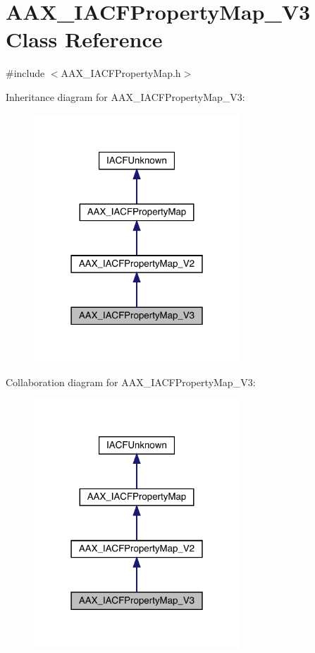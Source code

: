 \hypertarget{a01753}{}\section{A\+A\+X\+\_\+\+I\+A\+C\+F\+Property\+Map\+\_\+\+V3 Class Reference}
\label{a01753}


{\ttfamily \#include $<$A\+A\+X\+\_\+\+I\+A\+C\+F\+Property\+Map.\+h$>$}



Inheritance diagram for A\+A\+X\+\_\+\+I\+A\+C\+F\+Property\+Map\+\_\+\+V3\+:
\nopagebreak
\begin{figure}[H]
\begin{center}
\leavevmode
\includegraphics[width=219pt]{a01752}
\end{center}
\end{figure}


Collaboration diagram for A\+A\+X\+\_\+\+I\+A\+C\+F\+Property\+Map\+\_\+\+V3\+:
\nopagebreak
\begin{figure}[H]
\begin{center}
\leavevmode
\includegraphics[width=219pt]{a01751}
\end{center}
\end{figure}


